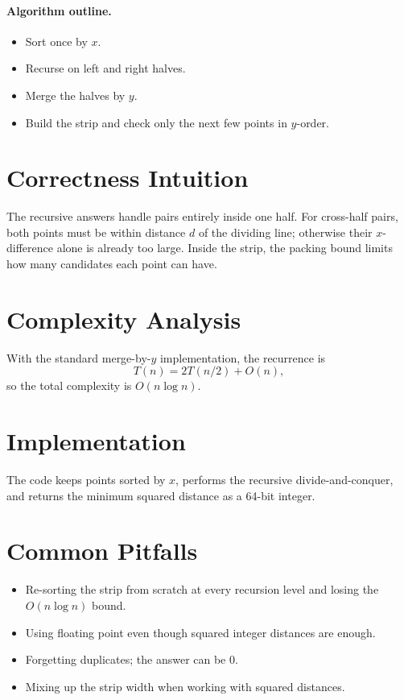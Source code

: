 \paragraph{Algorithm outline.}

\begin{itemize}
  \item Sort once by \(x\).
  \item Recurse on left and right halves.
  \item Merge the halves by \(y\).
  \item Build the strip and check only the next few points in \(y\)-order.
\end{itemize}

\section*{Correctness Intuition}

The recursive answers handle pairs entirely inside one half. For cross-half pairs, both points must be within distance
\(d\) of the dividing line; otherwise their \(x\)-difference alone is already too large. Inside the strip, the packing
bound limits how many candidates each point can have.

\section*{Complexity Analysis}

With the standard merge-by-\(y\) implementation, the recurrence is
\[
T(n) = 2T(n/2) + O(n),
\]
so the total complexity is \(O(n \log n)\).

\section*{Implementation}

The code keeps points sorted by \(x\), performs the recursive divide-and-conquer, and returns the minimum squared
distance as a 64-bit integer.

\section*{Common Pitfalls}

\begin{itemize}
  \item Re-sorting the strip from scratch at every recursion level and losing the \(O(n \log n)\) bound.
  \item Using floating point even though squared integer distances are enough.
  \item Forgetting duplicates; the answer can be \(0\).
  \item Mixing up the strip width when working with squared distances.
\end{itemize}

